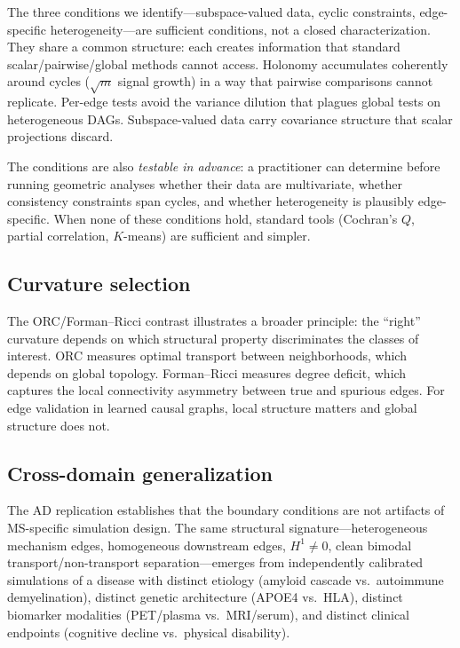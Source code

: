 \documentclass{article}
\begin{document}
The three conditions we identify---subspace-valued data, cyclic constraints, edge-specific heterogeneity---are sufficient conditions, not a closed characterization.
They share a common structure: each creates information that standard scalar/pairwise/global methods cannot access.
Holonomy accumulates coherently around cycles ($\sqrt{m}$ signal growth) in a way that pairwise comparisons cannot replicate.
Per-edge tests avoid the variance dilution that plagues global tests on heterogeneous DAGs.
Subspace-valued data carry covariance structure that scalar projections discard.

The conditions are also \emph{testable in advance}: a practitioner can determine before running geometric analyses whether their data are multivariate, whether consistency constraints span cycles, and whether heterogeneity is plausibly edge-specific.
When none of these conditions hold, standard tools (Cochran's $Q$, partial correlation, $K$-means) are sufficient and simpler.

\subsection{Curvature selection}

The ORC/Forman--Ricci contrast illustrates a broader principle: the ``right'' curvature depends on which structural property discriminates the classes of interest.
ORC measures optimal transport between neighborhoods, which depends on global topology.
Forman--Ricci measures degree deficit, which captures the local connectivity asymmetry between true and spurious edges.
For edge validation in learned causal graphs, local structure matters and global structure does not.

\subsection{Cross-domain generalization}

The AD replication establishes that the boundary conditions are not artifacts of MS-specific simulation design.
The same structural signature---heterogeneous mechanism edges, homogeneous downstream edges, $H^1 \neq 0$, clean bimodal transport/non-transport separation---emerges from independently calibrated simulations of a disease with distinct etiology (amyloid cascade vs.\ autoimmune demyelination), distinct genetic architecture (APOE4 vs.\ HLA), distinct biomarker modalities (PET/plasma vs.\ MRI/serum), and distinct clinical endpoints (cognitive decline vs.\ physical disability).
\end{document}
